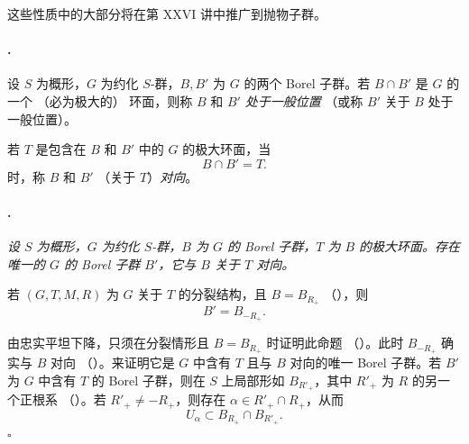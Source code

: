 这些性质中的大部分将在第 XXVI 讲中推广到抛物子群。

\paragraph{.}
设 \(S\) 为概形，\(G\) 为约化 \(S\)-群，\(B,B'\) 为 \(G\) 的两个 Borel 子群。若 \(B\cap B'\) 是 \(G\) 的一个 \textup{（必为极大的）} 环面，则称 \(B\) 和 \(B'\) \emph{处于一般位置} \textup{（或称 \(B'\) 关于 \(B\) 处于一般位置）}。

若 \(T\) 是包含在 \(B\) 和 \(B'\) 中的 \(G\) 的极大环面，当
\[
  B\cap B'=T.
\]
时，称 \(B\) 和 \(B'\) \textup{（关于 \(T\)）}\emph{对向}。

\paragraph{.}
{\itshape 设 \(S\) 为概形，\(G\) 为约化 \(S\)-群，\(B\) 为 \(G\) 的 Borel 子群，\(T\) 为 \(B\) 的极大环面。存在唯一的 \(G\) 的 Borel 子群 \(B'\)，它与 \(B\) 关于 \(T\) 对向。

若 \((G,T,M,R)\) 为 \(G\) 关于 \(T\) 的分裂结构，且 \(B=B_{R_+}\) \textup{（）}，则
\[
  B'=B_{-R_+}.
\]}

由忠实平坦下降，只须在分裂情形且 \(B=B_{R_+}\) 时证明此命题 \textup{（）}。此时 \(B_{-R_+}\) 确实与 \(B\) 对向 \textup{（）}。来证明它是 \(G\) 中含有 \(T\) 且与 \(B\) 对向的唯一 Borel 子群。若 \(B'\) 为 \(G\) 中含有 \(T\) 的 Borel 子群，则在 \(S\) 上局部形如 \(B_{R'_+}\)，其中 \(R'_+\) 为 \(R\) 的另一个正根系 \textup{（）}。若 \(R'_+\ne -R_+\)，则存在 \(\alpha\in R'_+\cap R_+\)，从而
\[
  U_\alpha\subset B_{R_+}\cap B_{R'_+}.
\]
\hfill\(\square\)

